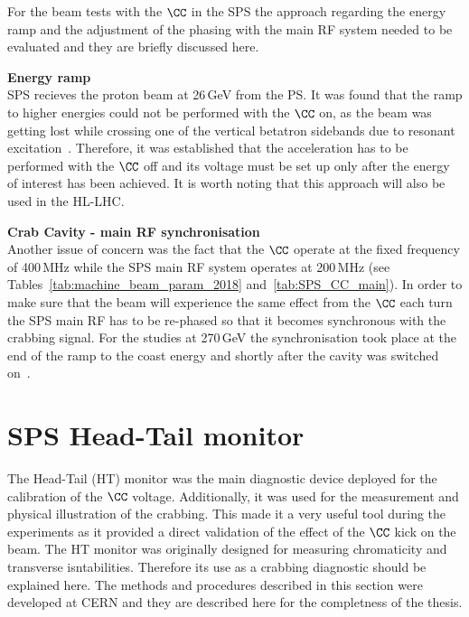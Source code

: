 For the beam tests with the $\CC$ in the SPS the approach regarding the energy ramp and the adjustment of the phasing with the main RF system needed to be evaluated and they are briefly discussed here.


\normalsize{\textbf{Energy ramp}}\\
SPS recieves the proton beam at 26\,GeV from the PS. It was found that the ramp to higher energies could not be performed with the $\CC$ on, as the beam was getting lost while crossing one of the vertical betatron sidebands due to resonant excitation~\cite{Rama_Paris_persentation}. Therefore, it was established that the acceleration has to be performed with the $\CC$ off and its voltage must be set up only after the energy of interest has been achieved. It is worth noting that this approach will also be used in the HL-LHC.

\normalsize{\textbf{Crab Cavity - main RF synchronisation}}\\
Another issue of concern was the fact that the $\CC$ operate at the fixed frequency of 400\,MHz while the SPS main RF system operates at 200\,MHz (see Tables~\ref{tab:machine_beam_param_2018} and~\ref{tab:SPS_CC_main}).
In order to make sure that the beam will experience the same effect from the $\CC$ each turn the SPS main RF has to be re-phased so that it becomes synchronous with the crabbing signal. For the studies at 270\,GeV the synchronisation took place at the end of the ramp to the coast energy and shortly after the cavity was switched on~\cite{BE_seminar}.


\section{SPS Head-Tail monitor}\label{sec:HT_info}
The Head-Tail (HT) monitor was the main diagnostic device deployed for the calibration of the $\CC$ voltage. Additionally, it was used for the measurement and physical illustration of the crabbing. This made it a very useful tool during the experiments as it provided a direct validation of the effect of the $\CC$ kick on the beam. The HT monitor was originally designed for measuring chromaticity and transverse isntabilities. Therefore its use as a crabbing diagnostic should be explained here. The methods and procedures described in this section were developed at CERN and they are described here for the completness of the thesis.


